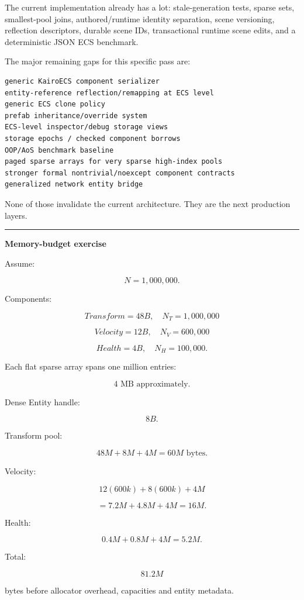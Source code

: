 The current implementation already has a lot: stale-generation tests, sparse sets, smallest-pool joins, authored/runtime identity separation, scene versioning, reflection descriptors, durable scene IDs, transactional runtime scene edits, and a deterministic JSON ECS benchmark.

The major remaining gaps for this specific pass are:

\begin{verbatim}
generic KairoECS component serializer
entity-reference reflection/remapping at ECS level
generic ECS clone policy
prefab inheritance/override system
ECS-level inspector/debug storage views
storage epochs / checked component borrows
OOP/AoS benchmark baseline
paged sparse arrays for very sparse high-index pools
stronger formal nontrivial/noexcept component contracts
generalized network entity bridge
\end{verbatim}

None of those invalidate the current architecture. They are the next production layers.

\begin{center}\rule{0.5\linewidth}{0.5pt}\end{center}

\textbf{Memory-budget exercise}

Assume:

\[
N=1,000,000.
\]

Components:

\[
Transform=48B,\quad N_T=1,000,000
\]

\[
Velocity=12B,\quad N_V=600,000
\]

\[
Health=4B,\quad N_H=100,000.
\]

Each flat sparse array spans one million entries:

\[
4\text{ MB approximately}.
\]

Dense Entity handle:

\[
8B.
\]

Transform pool:

\[
48M+8M+4M
=
60M\text{ bytes}.
\]

Velocity:

\[
12(600k)+8(600k)+4M
\]

\[
=7.2M+4.8M+4M
=
16M.
\]

Health:

\[
0.4M+0.8M+4M
=
5.2M.
\]

Total:

\[
81.2M
\]

bytes before allocator overhead, capacities and entity metadata.

